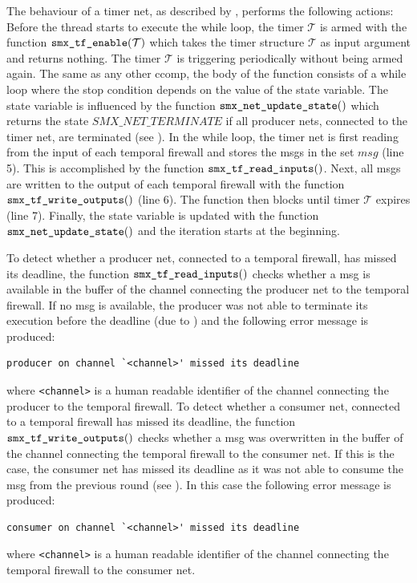 The behaviour of a timer net, as described by \Alg{\ref{alg_rts_timer}}, performs the following actions:
Before the thread starts to execute the while loop, the timer $\mathcal{T}$ is armed with the function $\textnormal{\tt smx\_tf\_enable}(\mathcal{T})$ which takes the timer structure $\mathcal{T}$ as input argument and returns nothing.
The timer $\mathcal{T}$ is triggering periodically without being armed again.
The same as any other \gls*{ccomp}, the body of the function consists of a while loop where the stop condition depends on the value of the state variable.
The state variable is influenced by the function $\textnormal{\tt smx\_net\_update\_state}()$ which returns the state $\mathit{SMX\_NET\_TERMINATE}$ if all producer nets, connected to the timer net, are terminated (see \Sect{\ref{sect_tool_rts_ccomp}}).
In the while loop, the timer net is first reading from the input of each temporal firewall and stores the \glspl*{msg} in the set $msg$ (line 5).
This is accomplished by the function $\textnormal{\tt smx\_tf\_read\_inputs}()$.
Next, all \glspl*{msg} are written to the output of each temporal firewall with the function $\textnormal{\tt smx\_tf\_write\_outputs}()$ (line 6).
The function then blocks until timer $\mathcal{T}$ expires (line 7).
Finally, the state variable is updated with the function $\textnormal{\tt smx\_net\_update\_state}()$ and the iteration starts at the beginning.

To detect whether a producer net, connected to a temporal firewall, has missed its deadline, the function $\textnormal{\tt smx\_tf\_read\_inputs}()$ checks whether a \gls*{msg} is available in the buffer of the channel connecting the producer net to the temporal firewall.
If no \gls*{msg} is available, the producer was not able to terminate its execution before the deadline (due to \Propty{\ref{propty_tt_out}}) and the following error message is produced:
\begin{lstlisting}[style=msg]
producer on channel `<channel>' missed its deadline
\end{lstlisting}
where \texttt{<channel>} is a human readable identifier of the channel connecting the producer to the temporal firewall.
To detect whether a consumer net, connected to a temporal firewall has missed its deadline, the function $\textnormal{\tt smx\_tf\_write\_outputs}()$ checks whether a \gls*{msg} was overwritten in the buffer of the channel connecting the temporal firewall to the consumer net.
If this is the case, the consumer net has missed its deadline as it was not able to consume the \gls*{msg} from the previous round (see \Propty{\ref{propty_tt_in}}).
In this case the following error message is produced:
\begin{lstlisting}[style=msg]
consumer on channel `<channel>' missed its deadline
\end{lstlisting}
where \texttt{<channel>} is a human readable identifier of the channel connecting the temporal firewall to the consumer net.

